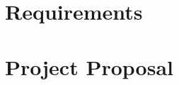 \documentclass[12pt,a4paper,twoside,openright]{report}
\begin{document}
\appendix

\chapter{Requirements}
\label{appendix::requirements}



\chapter*{Project Proposal}
\label{project_proposal}


\end{document}
